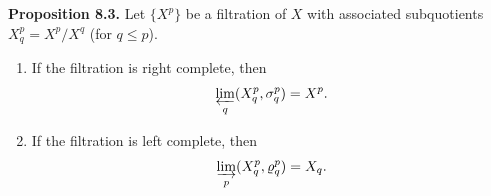 \textbf{Proposition 8.3.} Let $\{X^p\}$ be a filtration of $X$ with associated subquotients $X_q^p = X^p / X^q$ (for $q \leq p$).
\begin{enumerate}
\item[(i)] If the filtration is right complete, then
$$
\varprojlim_q (X_q^p, \sigma_q^p) = X^p.
$$
\item[(ii)] If the filtration is left complete, then
$$
\varinjlim_p (X_q^p, \varrho_q^p) = X_q.
$$
\end{enumerate}
